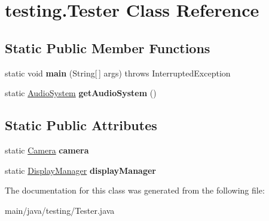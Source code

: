 \hypertarget{classtesting_1_1_tester}{}\section{testing.\+Tester Class Reference}
\label{classtesting_1_1_tester}
\subsection*{Static Public Member Functions}
\begin{DoxyCompactItemize}
\item 
\mbox{\label{classtesting_1_1_tester_a17d4ee81296e7204aefeb80bbfdbbd0f}} 
static void {\bfseries main} (String\mbox{[}$\,$\mbox{]} args)  throws Interrupted\+Exception 
\item 
\mbox{\label{classtesting_1_1_tester_a412bc40651ebbb37c82dceae983a68e3}} 
static \mbox{\hyperlink{classde_1_1me_1_1edgelord_1_1sjgl_1_1audio_1_1_audio_system}{Audio\+System}} {\bfseries get\+Audio\+System} ()
\end{DoxyCompactItemize}
\subsection*{Static Public Attributes}
\begin{DoxyCompactItemize}
\item 
\mbox{\label{classtesting_1_1_tester_af7b1e6ffabcf7a8550a1a3a23e02e5b3}} 
static \mbox{\hyperlink{classde_1_1me_1_1edgelord_1_1sjgl_1_1camera_1_1_camera}{Camera}} {\bfseries camera}
\item 
\mbox{\label{classtesting_1_1_tester_ae450d2ce3f31873d74667bbef9e645a4}} 
static \mbox{\hyperlink{classde_1_1me_1_1edgelord_1_1sjgl_1_1display_1_1_display_manager}{Display\+Manager}} {\bfseries display\+Manager}
\end{DoxyCompactItemize}


The documentation for this class was generated from the following file\+:\begin{DoxyCompactItemize}
\item 
main/java/testing/Tester.\+java\end{DoxyCompactItemize}
